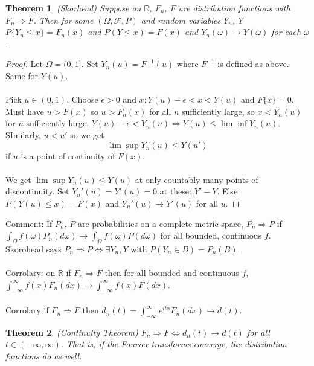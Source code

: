 \documentclass[12pt]{article}
\newtheorem{theorem}{Theorem}
\begin{document}
\begin{theorem}
(Skorhead) Suppose on $\mathbb{R}$, $F_n$, $F$ are distribution functions with $F_n \Rightarrow F$.  Then for some $(\Omega, \mathcal{F}, P)$ and random variables $Y_n$, $Y$ $P\{Y_n \le x \} = F_n(x)$ and $P(Y \le x) = F(x)$ and $Y_n(\omega) \to Y(\omega)$ for each $\omega$.
\end{theorem}
\begin{proof}
Let $\Omega = (0, 1]$.  Set $Y_n(u) = F^{-1}(u)$ where $F^{-1}$ is defined as above.  Same for $Y(u)$.
\\ \\
Pick $u \in (0, 1)$.  Choose $\epsilon > 0$ and $x : Y(u) - \epsilon < x < Y(u)$ and $F \{ x \} = 0$.  Must have $u > F(x)$ so $u > F_n(x)$ for all $n$ sufficiently large, so $x < Y_n(u)$ for $n$ sufficiently large.  $Y(u) - \epsilon < Y_n(u) \Rightarrow Y(u) \le \lim \inf Y_n(u)$.  SImilarly, $u < u'$ so we get
$$\lim \sup Y_n(u) \le Y(u')$$
if $u$ is a point of continuity of $F(x)$.
\\ \\
We get $\lim \sup Y_n(u) \le Y(u)$ at only countably many points of discontinuity.  Set $Y_n'(u) = Y'(u) = 0$ at these: $Y' - Y$.  Else $P(Y(u) \le x) = F(x)$ and $Y_n'(u) \to Y'(u)$ for all $u$.
\end{proof}
Comment: If $P_n$, $P$ are probabilities on a complete metric space, $P_n \Rightarrow P$ if $\int_\Omega f(\omega) P_n(d \omega) \to \int_\Omega f(\omega) P(d \omega)$ for all bounded, continuous $f$.  Skorohead says $P_n \Rightarrow P \Leftrightarrow \exists Y_n, Y$ with $P(Y_n \in B) = P_n(B)$.
\\ \\
Corrolary: on $\mathbb{R}$ if $F_n \Rightarrow F$ then for all bounded and continuous $f$, $\int_{-\infty}^\infty f(x) F_n(dx) \rightarrow \int_{-\infty}^\infty f(x) F(dx)$.
\\ \\
Corrolary if $F_n \Rightarrow F$ then $d_n(t) = \int_{-\infty}^\infty e^{itx} F_n(dx) \to d(t)$.  
\begin{theorem}
 (Continuity Theorem) $F_n \Rightarrow F \Leftrightarrow d_n(t) \rightarrow d(t)$ for all $t \in (-\infty, \infty)$.  That is, if the Fourier transforms converge, the distribution functions do as well.
\end{theorem}
\end{document}
